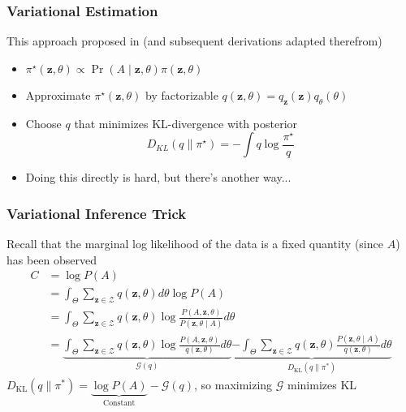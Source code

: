 \documentclass{beamer}
\newcommand{\1}{\mathbbm{1}}
\newcommand{\V}[1]{\ensuremath{\boldsymbol{#1}}} %
\newcommand{\M}[1]{\ensuremath{#1}} %
\begin{document}
\begin{frame}
  \frametitle{Variational Estimation}
  This approach proposed in \parencite{aicher_adapting_2013,aicher_learning_2015} (and subsequent derivations adapted therefrom) 
  \begin{itemize}
  \item $\pi^{\star}(\V{z}, \M{\theta}) \propto \operatorname{Pr}(\M{A} \mid \V{z}, \M{\theta}) \pi(\V{z}, \M{\theta})$
  \item Approximate $\pi^{\star}(\V{z}, \M{\theta})$ by factorizable $q(\V{z},\M{\theta}) = q_{\V{z}}(\V{z}) q_{\M{\theta}}(\M{\theta})$
  \item Choose $q$ that minimizes KL-divergence with posterior
    \begin{equation*}
      D_{KL}(q \parallel \pi^{\star}) = - \int q \log \frac{\pi^{\star}}{q}
    \end{equation*}
  \item Doing this directly is hard, but there's another way...
  \end{itemize}
\end{frame}

\begin{frame}
  \frametitle{Variational Inference Trick}
  Recall that the marginal log likelihood of the data is a fixed quantity (since $A$) has been observed
  \begin{align*}
    C &= \log P(A) \\
    &= \int_{\Theta} \sum_{\V{z} \in \mathcal{Z}} q(\V{z},\theta) d\theta \log P(A) \tag{Multiply by 1}\\
              &= \int_{\Theta} \sum_{\V{z} \in \mathcal{Z}} q(\V{z},\theta) \log \frac{P(A, \V{z}, \M{\theta})}{P(\V{z}, \M{\theta} \mid A)} d\theta \tag{Conditioning tricks}\\
              &= \underbrace{\int_{\Theta} \sum_{\V{z} \in \mathcal{Z}} q(\V{z},\theta) \log \frac{P(A, \V{z}, \M{\theta})}{q(\V{z}, \theta)} d\theta}_{\mathcal{G}(q)}  \underbrace{- \int_{\Theta} \sum_{\V{z} \in \mathcal{Z}} q(\V{z}, \theta) \frac{P(\V{z}, \M{\theta} \mid A)}{q(\V{z}, \theta)} d\theta}_{D_{\text{KL}}(q \parallel \pi^{*})}
  \end{align*}
  $D_{\text{KL}}(q \parallel \pi^{*}) = \underbrace{\log P(A)}_{\text{Constant}} - \mathcal{G}(q)$, so maximizing $\mathcal{G}$ minimizes KL
\end{frame}
\end{document}
